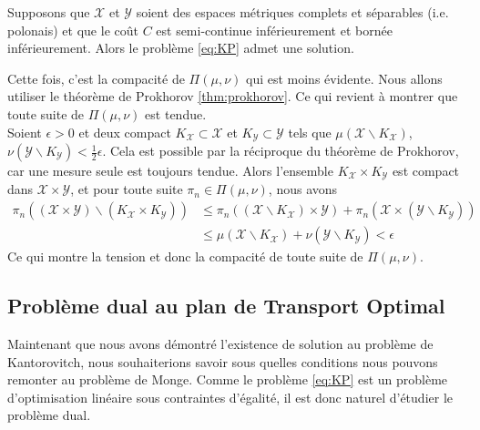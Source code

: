 \documentclass[a4paper,12pt]{article}
\begin{document}
\begin{proposition}\label{prop:existKP3}
Supposons que $\mathcal{X}$ et $\mathcal{Y}$ soient des espaces métriques complets et séparables (i.e. polonais) et que le coût $C$ est semi-continue inférieurement et bornée inférieurement. Alors le problème \eqref{eq:KP} admet une solution. 
\end{proposition}
\begin{preuve}
Cette fois, c'est la compacité de $\Pi(\mu,\nu)$ qui est moins évidente. Nous allons utiliser le théorème de Prokhorov \eqref{thm:prokhorov}. Ce qui revient à montrer que toute suite de $\Pi (\mu,\nu)$ est tendue. \\
Soient $\epsilon >0$ et deux compact $K_{\mathcal{X}}\subset\mathcal{X}$ et $K_{\mathcal{Y}}\subset \mathcal{Y}$ tels que $\mu (\mathcal{X}\backslash K_{\mathcal{X}})$, $\nu (\mathcal{Y} \backslash K_{\mathcal{Y}}) < \frac{1}{2}\epsilon$. Cela est possible par la réciproque du théorème de Prokhorov, car une mesure seule est toujours tendue. 
Alors l'ensemble $K_{\mathcal{X}}\times K_{\mathcal{Y}}$ est compact dans $\mathcal{X}\times\mathcal{Y}$, et pour toute suite $\pi_n\in\Pi (\mu,\nu )$, nous avons 
\begin{align*}
\pi_n\left((\mathcal{X}\times\mathcal{Y})\backslash (K_{\mathcal{X}}\times K_{\mathcal{Y}}) \right) &\leq \pi_n((\mathcal{X}\backslash K_{\mathcal{X}})\times \mathcal{Y}) + \pi_n(\mathcal{X}\times (\mathcal{Y}\backslash K_{\mathcal{Y}}))\\
&\leq \mu (\mathcal{X} \backslash K_{\mathcal{X}}) + \nu (\mathcal{Y}\backslash K_{\mathcal{Y}}) < \epsilon
\end{align*}
Ce qui montre la tension et donc la compacité de toute suite de $\Pi (\mu,\nu )$. 
\end{preuve}

\subsection{Problème dual au plan de Transport Optimal}
Maintenant que nous avons démontré l'existence de solution au problème de Kantorovitch, nous souhaiterions savoir sous quelles conditions nous pouvons remonter au problème de Monge. Comme le problème \eqref{eq:KP} est un problème d'optimisation linéaire sous contraintes d'égalité, il est donc naturel d'étudier le problème dual. \\
\end{document}
